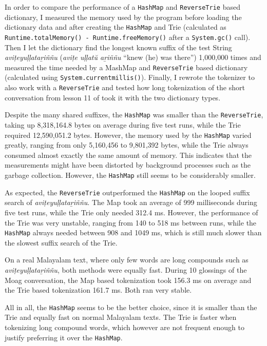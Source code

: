 \documentclass[a4paper]{article}
\newcommand{\typ}[1]{\texttt{#1}}
\begin{document}
In order to compare the performance of a \typ{HashMap} and \typ{ReverseTrie} based dictionary, I measured the memory used by the program before loading the dictionary data and after creating the \typ{HashMap} and Trie (calculated as \typ{Runtime.totalMemory() - Runtime.freeMemory()} after a \typ{System.gc()} call). Then I let the dictionary find the longest known suffix of the test String \textit{aviṭeyuḷḷataṟiññu} (\textit{aviṭe uḷḷatŭ aṟiññu} ``knew (he) was there'') 1,000,000 times and measured the time needed by a MashMap and \typ{ReverseTrie} based dictionary (calculated using \typ{System.currentmillis()}). Finally, I rewrote the tokenizer to also work with a \typ{ReverseTrie} and tested how long tokenization of the short conversation from lesson 11 of \textcite[p.164f]{moag} took it with the two dictionary types.

Despite the many shared suffixes, the \typ{HashMap} was smaller than the \typ{ReverseTrie}, taking up 8,318,164.8 bytes on average during five test runs, while the Trie required 12,590,051.2 bytes. However, the memory used by the \typ{HashMap} varied greatly, ranging from only 5,160,456 to 9,801,392 bytes, while the Trie always consumed almost exactly the same amount of memory. This indicates that the measurements might have been distorted by background processes such as the garbage collection. However, the \typ{HashMap} still seems to be considerably smaller.

As expected, the \typ{ReverseTrie} outperformed the \typ{HashMap} on the looped suffix search of \textit{aviṭeyuḷḷataṟiññu}. The Map took an average of 999 milliseconds during five test runs, while the Trie only needed 312.4 ms. However, the performance of the Trie was very unstable, ranging from 140 to 518 ms between runs, while the \typ{HashMap} always needed between 908 and 1049 ms, which is still much slower than the slowest suffix search of the Trie.

On a real Malayalam text, where only few words are long compounds such as \textit{aviṭeyuḷḷataṟiññu}, both methods were equally fast. During 10 glossings of the Moag conversation, the Map based tokenization took 156.3 ms on average and the Trie based tokenization 161.7 ms. Both ran very stable.

All in all, the \typ{HashMap} seems to be the better choice, since it is smaller than the Trie and equally fast on normal Malayalam texts. The Trie is faster when tokenizing long compound words, which however are not frequent enough to justify preferring it over the \typ{HashMap}.
\end{document}

